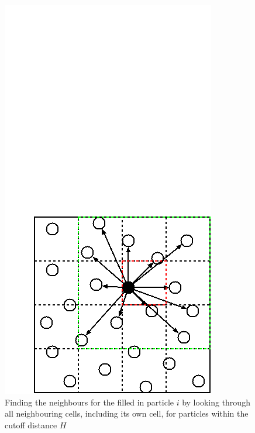     \begin{figure}
    \includegraphics[width=\linewidth]{img/CellLists2.png}
    \caption{Finding the neighbours for the filled in particle $i$ by looking through all neighbouring cells, including its own cell, for particles within the cutoff distance $H$}
    \label{fig:cellList}
    \end{figure}

